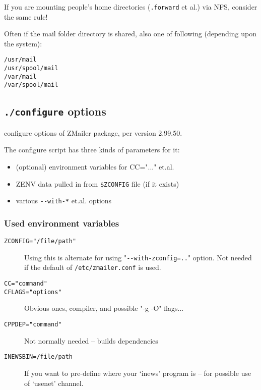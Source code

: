 If you are mounting people's home directories ({\tt .forward} et al.)
via NFS, consider the same rule!

Often if the mail folder directory is shared, also
one of following (depending upon the system):
\begin{alltt}
    /usr/mail
    /usr/spool/mail
    /var/mail
    /var/spool/mail
\end{alltt}


\subsection{{\tt ./configure} options}%
%
%
\label{configure_options_list}

configure  options of ZMailer package, per version 2.99.50.


The  configure  script has three kinds of parameters for it:
\begin{itemize}
\item (optional) environment variables for CC="..." et.al.
\item ZENV data pulled in from {\tt \$ZCONFIG} file (if it exists)
\item various  \verb/--with-*/  et.al. options
\end{itemize}


\subsubsection{Used environment variables}

\begin{description}
\item[\tt ZCONFIG="/file/path"] \mbox{}

Using this is alternate for using "\verb/--with-zconfig=../" option.
Not needed if the default of {\tt /etc/zmailer.conf} is used.

\item[\tt CC="command"]
\item[\tt CFLAGS="options"] \mbox{}

Obvious ones, compiler, and possible "-g -O" flags...

\item[\tt CPPDEP="command"] \mbox{}

Not normally needed -- builds dependencies

\item[\tt INEWSBIN=/file/path] \mbox{}

If you want to pre-define where your `inews' program
is -- for possible use of `usenet' channel.
\end{description}

